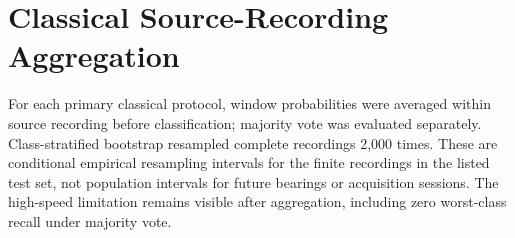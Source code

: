 \documentclass[11pt]{article}
\begin{document}
\begin{table}[H]
\centering
\caption{Outer-race date--severity composite prediction across ten repeated source-grouped folds. Values are mean $\pm$ standard deviation.}
\label{tab:s_outer_date}
\small
{}
\end{table}

\section{Classical Source-Recording Aggregation}
For each primary classical protocol, window probabilities were averaged within source recording before classification; majority vote was evaluated separately. Class-stratified bootstrap resampled complete recordings 2,000 times. These are conditional empirical resampling intervals for the finite recordings in the listed test set, not population intervals for future bearings or acquisition sessions. The high-speed limitation remains visible after aggregation, including zero worst-class recall under majority vote.
\end{document}
